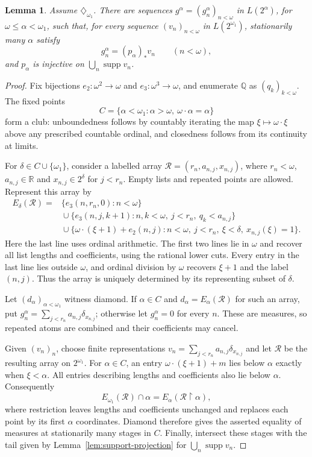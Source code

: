 \documentclass[a4paper,11pt]{amsart}
\theoremstyle{plain}
\newtheorem{lemma}[theorem]{Lemma}
\theoremstyle{definition}
\theoremstyle{remark}
\newcommand{\supp}{\operatorname{supp}}
\numberwithin{equation}{section}
\begin{document}
\begin{lemma}\label{lem:diamond}
Assume $\diamondsuit_{\omega_1}$. There are sequences
$g^\alpha=(g_n^\alpha)_{n<\omega}$ in $L(2^\alpha)$, for
$\omega\leqslant\alpha<\omega_1$, such that, for every sequence
$(v_n)_{n<\omega}$ in $L(2^{\omega_1})$, stationarily many $\alpha$
satisfy
\[
 g_n^\alpha=(p_\alpha)_*v_n\qquad(n<\omega),
\]
and $p_\alpha$ is injective on $\bigcup_n\supp v_n$.
\end{lemma}
\begin{proof}
Fix bijections $e_2:\omega^2\to\omega$ and
$e_3:\omega^3\to\omega$, and enumerate $\mathbb Q$ as
$(q_k)_{k<\omega}$. The fixed points
\[
 C=\{\alpha<\omega_1:\alpha>\omega,\ \omega\cdot\alpha=\alpha\}
\]
form a club: unboundedness follows by countably iterating the map
$\xi\mapsto\omega\cdot\xi$ above any prescribed countable ordinal,
and closedness follows from its continuity at limits.

For $\delta\in C\cup\{\omega_1\}$, consider a labelled array
$\mathcal R=(r_n,a_{n,j},x_{n,j})$, where $r_n<\omega$,
$a_{n,j}\in\mathbb R$ and $x_{n,j}\in2^\delta$ for $j<r_n$.
Empty lists and repeated points are allowed. Represent this array by
\[
\begin{split}
 E_\delta(\mathcal R)={}&
 \{e_3(n,r_n,0):n<\omega\}\\
 &{}\cup\{e_3(n,j,k+1):n,k<\omega,\ j<r_n,\ q_k<a_{n,j}\}\\
 &{}\cup\{\omega\cdot(\xi+1)+e_2(n,j):n<\omega,\ j<r_n,
          \ \xi<\delta,\ x_{n,j}(\xi)=1\}.
\end{split}
\]
Here the last line uses ordinal arithmetic. The first two lines lie
in $\omega$ and recover all list lengths and coefficients, using
the rational lower cuts. Every entry in the last line lies outside
$\omega$, and ordinal division by $\omega$ recovers $\xi+1$ and
the label $(n,j)$. Thus the array is uniquely determined by its
representing subset of $\delta$.

Let $(d_\alpha)_{\alpha<\omega_1}$ witness diamond. If $\alpha\in C$
and $d_\alpha=E_\alpha(\mathcal R)$ for such an array, put
$g_n^\alpha=\sum_{j<r_n}a_{n,j}\delta_{x_{n,j}}$; otherwise let
$g_n^\alpha=0$ for every $n$. These are measures, so repeated atoms
are combined and their coefficients may cancel.

Given $(v_n)_n$, choose finite representations
$v_n=\sum_{j<r_n}a_{n,j}\delta_{x_{n,j}}$ and let $\mathcal R$ be
the resulting array on $2^{\omega_1}$. For $\alpha\in C$, an entry
$\omega\cdot(\xi+1)+m$ lies below $\alpha$ exactly when
$\xi<\alpha$. All entries describing lengths and coefficients also
lie below $\alpha$. Consequently
\[
 E_{\omega_1}(\mathcal R)\cap\alpha
   =E_\alpha(\mathcal R\restriction\alpha),
\]
where restriction leaves lengths and coefficients unchanged and
replaces each point by its first $\alpha$ coordinates. Diamond
therefore gives the asserted equality of measures at stationarily
many stages in $C$. Finally, intersect these stages with the tail
given by Lemma~\ref{lem:support-projection} for
$\bigcup_n\supp v_n$.
\end{proof}
\end{document}
